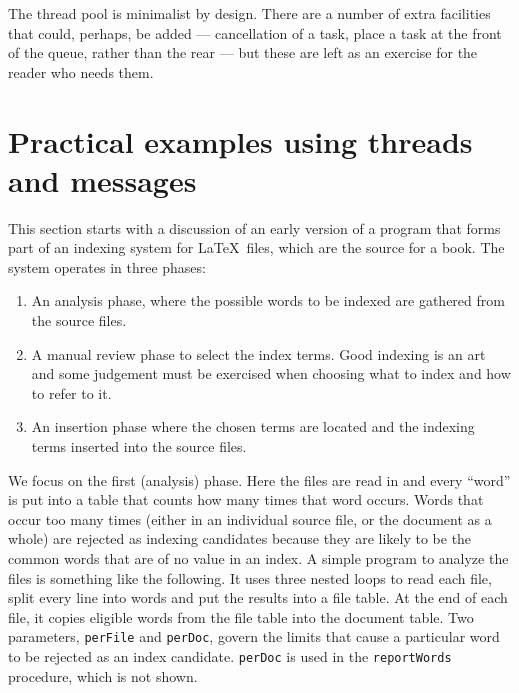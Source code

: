 The thread pool is minimalist by design. There are a number of extra facilities
that could, perhaps, be added --- cancellation of a task, place a task at the
front of the queue, rather than the rear --- but these are left as an exercise
for the reader who needs them.

\section{Practical examples using threads and messages}
This section starts with a discussion of an early version of a program that
forms part of an indexing system for \LaTeX\ files, which are the source for a
book.  The system operates in three phases:
\begin{enumerate}
\item An analysis phase, where the possible words to be indexed are gathered
      from the source files.
\item A manual review phase to select the index terms. Good indexing
      is an art and some judgement must be exercised when choosing
      what to index and how to refer to it.
\item An insertion phase where the chosen terms are located and the indexing
      terms inserted into the source files.
\end{enumerate}
We focus on the first (analysis) phase. Here the files are read in and every
``word'' is put into a table that counts how many times that word occurs. 
Words that occur too many times (either in an individual source file, or the
document as a whole) are rejected as indexing candidates because they are likely
to be the common words that are of no value in an index.
A simple program to analyze the files is something like the following. It uses
three nested loops to read each file, split every line into words and put the
results into a file table. At the end of each file, it copies eligible words from
the file table into the document table.
Two parameters, \texttt{perFile} and \texttt{perDoc}, govern the limits that cause
a particular word to be rejected as an index candidate. \texttt{perDoc} is used
in the \texttt{reportWords} procedure, which is not shown.

